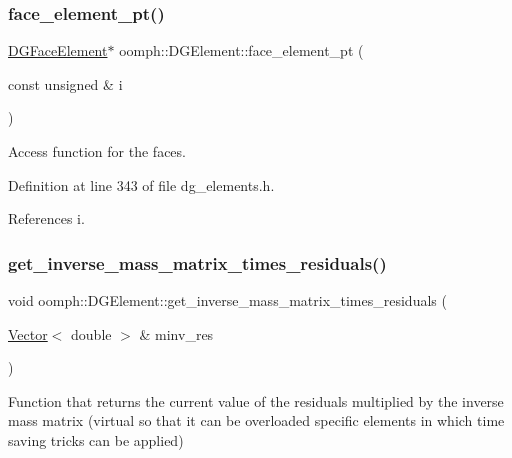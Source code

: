 \subsubsection{\texorpdfstring{face\+\_\+element\+\_\+pt()}{face\_element\_pt()}}
{\footnotesize\ttfamily \hyperlink{classoomph_1_1DGFaceElement}{D\+G\+Face\+Element}$\ast$ oomph\+::\+D\+G\+Element\+::face\+\_\+element\+\_\+pt (\begin{DoxyParamCaption}\item[{const unsigned \&}]{i }\end{DoxyParamCaption})\hspace{0.3cm}{\ttfamily [inline]}}



Access function for the faces. 



Definition at line 343 of file dg\+\_\+elements.\+h.



References i.

\mbox{\label{classoomph_1_1DGElement_ad2247a9d65eb229dbf30d709c7b28d6d}} 
\subsubsection{\texorpdfstring{get\+\_\+inverse\+\_\+mass\+\_\+matrix\+\_\+times\+\_\+residuals()}{get\_inverse\_mass\_matrix\_times\_residuals()}}
{\footnotesize\ttfamily void oomph\+::\+D\+G\+Element\+::get\+\_\+inverse\+\_\+mass\+\_\+matrix\+\_\+times\+\_\+residuals (\begin{DoxyParamCaption}\item[{\hyperlink{classoomph_1_1Vector}{Vector}$<$ double $>$ \&}]{minv\+\_\+res }\end{DoxyParamCaption})\hspace{0.3cm}{\ttfamily [virtual]}}



Function that returns the current value of the residuals multiplied by the inverse mass matrix (virtual so that it can be overloaded specific elements in which time saving tricks can be applied) 


